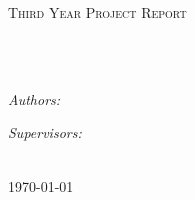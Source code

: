 \documentclass[
11pt, %
english, %
doublespacing, %
headsepline, %
]{MastersDoctoralThesis} %
\author{Kitty Fung, Edward Gunn, Terence Tan, Di Wan} %
\begin{document}

\pagestyle{plain} %


\begin{titlepage}
\begin{center}

\vspace*{.06\textheight}
\textsc{\Large Third Year Project Report}\\[0.5cm] %

\HRule \\[0.4cm] %
{\huge \ttitle\par}\vspace{0.4cm} %
\HRule \\[1.5cm] %
 
\begin{minipage}[t]{0.4\textwidth}
\begin{flushleft} \large
\emph{Authors:}\\
{\authorname} %
\end{flushleft}
\end{minipage}
\begin{minipage}[t]{0.4\textwidth}
\begin{flushright} \large
\emph{Supervisors:} \\
{\supname} %
\end{flushright}
\end{minipage}\\[3cm]
 

 

{\large \today}\\[4cm] %
 
\end{center}
\end{titlepage}
\end{document}
